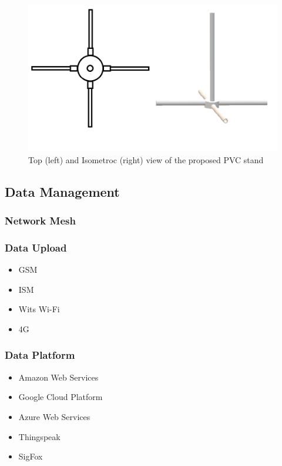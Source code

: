 \documentclass[10pt,twocolumn]{witseiepaper}
\begin{document}
		\begin{figure}
			\centering
			\includegraphics[width=1\columnwidth]{media/topIsoStand.png}
			\caption{Top (left) and Isometroc (right) view of the proposed PVC stand}
			\raggedright
			\label{fig:stand}
		\end{figure}
	
	\subsection{Data Management}
		\subsubsection{Network Mesh}
		\subsubsection{Data Upload}
			\begin{itemize}
				\item GSM
				\item ISM
				\item Wits Wi-Fi
				\item 4G
			\end{itemize}
		\subsubsection{Data Platform}
			\begin{itemize}
				\item Amazon Web Services
				\item Google Cloud Platform
				\item Azure Web Services
				\item Thingspeak
				\item SigFox
			\end{itemize}
	
\end{document}

